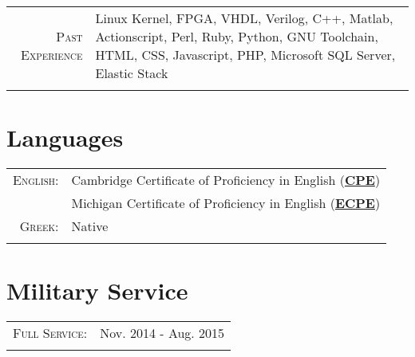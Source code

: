 \documentclass[a4paper,10pt]{article} %
\begin{document}
\begin{tabular}{rp{}}
\textsc{Past Experience} & Linux Kernel, FPGA, VHDL, Verilog, C++, Matlab, Actionscript,  Perl, Ruby, Python, GNU Toolchain, HTML, CSS, Javascript, PHP, Microsoft SQL Server, Elastic Stack \\
\\
\end{tabular}


\section{Languages}

\begin{tabular}{rl}

\textsc{English:} & Cambridge Certificate of Proficiency in English (\textbf{\href{https://www.cambridgeenglish.org/exams-and-tests/proficiency/}{CPE}}) \\
& Michigan Certificate of Proficiency in English (\textbf{\href{https://michiganassessment.org/test-takers/tests/ecpe/}{ECPE}}) \\

\textsc{Greek:} & Native \\
\\

\end{tabular}


\section{Military Service}

\begin{tabular}{rl}

\textsc{Full Service:} & Nov. 2014 - Aug. 2015 \\
\\

\end{tabular}

\end{document}
